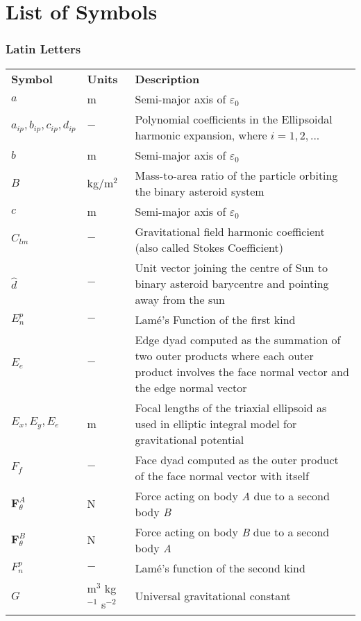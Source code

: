 \chapter*{List of Symbols}
\label{los}

\subsection*{Latin Letters}
\begin{longtable}[l]{p{100pt} p{70pt} p{250pt}}
\textbf{Symbol}	& \textbf{Units} & \textbf{Description} \\

$a$		& m		& Semi-major axis of $\varepsilon_0$\\
$a_{ip}, b_{ip}, c_{ip}, d_{ip}$ 	& $-$	& Polynomial coefficients in the Ellipsoidal harmonic expansion, where $i=1,2,...$\\
$b$		& m		& Semi-major axis of $\varepsilon_0$\\
$B$		& kg$/$m$^2$		& Mass-to-area ratio of the particle orbiting the binary asteroid system\\
$c$		& m		& Semi-major axis of $\varepsilon_0$\\
$C_{lm}$	 & $-$	& Gravitational field harmonic coefficient (also called Stokes Coefficient)\\
$\hat{d}$		& $-$	& Unit vector joining the centre of Sun to binary asteroid barycentre and pointing away from the sun\\
$E_n^p$		& $-$		& Lam\' e's Function of the first kind\\
$E_e$		& $-$		& Edge dyad computed as the summation of two outer products where each outer product involves the face normal vector and the edge normal vector\\
$E_x, E_y, E_e$		& m		& Focal lengths of the triaxial ellipsoid as used in elliptic integral model for gravitational potential\\
$F_f$		& $-$		& Face dyad computed as the outer product of the face normal vector with itself\\
$\mathbf{F}_\theta^A$	& N 	& Force acting on body \textit{A} due to a second body \textit{B}\\
$\mathbf{F}_\theta^B$	& N 	& Force acting on body \textit{B} due to a second body \textit{A}\\
$F_n^p$		& $-$		& Lam\' e's function of the second kind\\
$G$		& m$^3$ kg$^{-1}$ s$^{-2}$		& Universal gravitational constant\\

\end{longtable}
